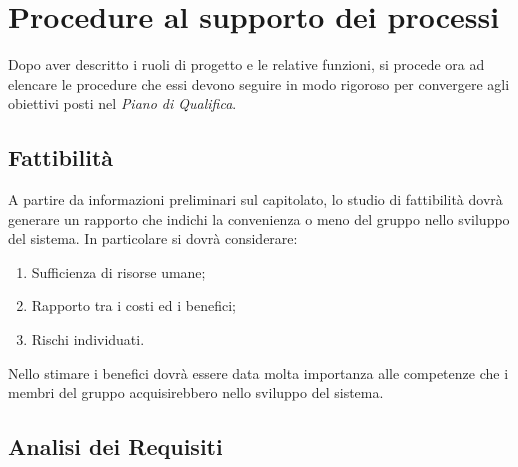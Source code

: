 \section{Procedure al supporto dei processi}{
Dopo aver descritto i ruoli di progetto e le relative funzioni, si procede ora ad elencare le procedure che essi devono seguire in modo rigoroso per convergere agli obiettivi posti nel \textit{Piano di Qualifica}.
	\subsection{Fattibilità}{
		A partire da informazioni preliminari sul capitolato, lo studio di fattibilità dovrà generare un rapporto che indichi la convenienza o meno del gruppo nello sviluppo del sistema. In particolare si dovrà considerare:
		\begin{enumerate}
			\item Sufficienza di risorse umane;
			\item Rapporto tra i costi ed i benefici;
			\item Rischi individuati.
		\end{enumerate}
		Nello stimare i benefici dovrà essere data molta importanza alle competenze che i membri del gruppo acquisirebbero nello sviluppo del sistema.
	 }
	\subsection{Analisi dei Requisiti}{ 
}}
